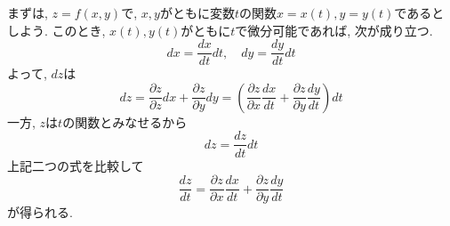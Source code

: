         まずは, $z=f(x,y)$で, $x,y$がともに変数$t$の関数$x=x(t),y=y(t)$であるとしよう. このとき, $x(t),y(t)$がともに$t$で微分可能であれば, 次が成り立つ.
        \begin{equation*}
            dx=\frac{dx}{dt}dt,\quad dy=\frac{dy}{dt}dt
        \end{equation*}
        よって, $dz$は
        \begin{equation*}
            dz = \frac{\partial z}{\partial z}dx+\frac{\partial z}{\partial y}dy=\left(\frac{\partial z}{\partial x}\frac{dx}{dt}+\frac{\partial z}{\partial y}\frac{dy}{dt}\right)dt
        \end{equation*}
        一方, $z$は$t$の関数とみなせるから
        \begin{equation*}
            dz=\frac{dz}{dt}dt
        \end{equation*}
        上記二つの式を比較して
        \begin{equation}
            \frac{dz}{dt}=\frac{\partial z}{\partial x}\frac{dx}{dt}+\frac{\partial z}{\partial y}\frac{dy}{dt} \label{eq:偏微分:合成関数の微分t}
        \end{equation}
        が得られる. \\

